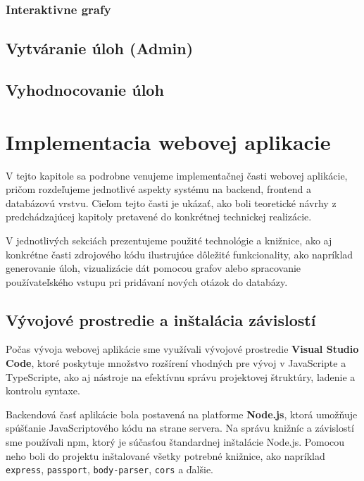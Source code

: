 \subsubsection{Interaktivne grafy}
\subsection{Vytváranie úloh (Admin)}

\subsection{Vyhodnocovanie úloh}



 \section{Implementacia webovej aplikacie}
 V tejto kapitole sa podrobne venujeme implementačnej časti webovej aplikácie, pričom rozdeľujeme jednotlivé aspekty systému na backend, frontend a databázovú vrstvu.
  Cieľom tejto časti je ukázať, ako boli teoretické návrhy z predchádzajúcej kapitoly pretavené do konkrétnej technickej realizácie.

 V jednotlivých sekciách prezentujeme použité technológie a knižnice, ako aj konkrétne časti zdrojového kódu ilustrujúce dôležité funkcionality, 
 ako napríklad generovanie úloh, vizualizácie dát pomocou grafov alebo spracovanie používateľského vstupu pri pridávaní nových otázok do databázy.

 \subsection{Vývojové prostredie a inštalácia závislostí}

 Počas vývoja webovej aplikácie sme využívali vývojové prostredie \textbf{Visual Studio Code}\cite{vscode}, ktoré poskytuje množstvo rozšírení vhodných pre vývoj v JavaScripte a TypeScripte, ako aj nástroje na efektívnu správu projektovej štruktúry, ladenie a kontrolu syntaxe.
 
 Backendová časť aplikácie bola postavená na platforme \textbf{Node.js}, ktorá umožňuje spúšťanie JavaScriptového kódu na strane servera. Na správu knižníc a závislostí sme používali \acrfull{npm}, ktorý je súčasťou štandardnej inštalácie Node.js. 
 Pomocou neho boli do projektu inštalované všetky potrebné knižnice, ako napríklad \texttt{express}, \texttt{passport}, \texttt{body-parser}, \texttt{cors} a ďalšie.
  

